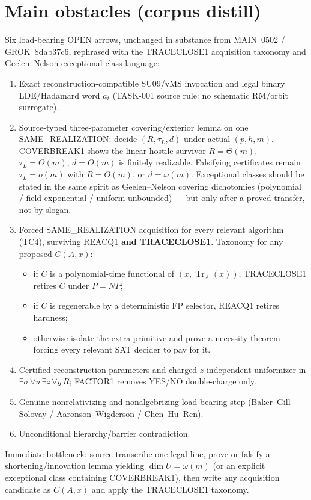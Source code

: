 \documentclass[11pt]{article}
\begin{document}
\section*{Main obstacles (corpus distill)}
Six load-bearing OPEN arrows, unchanged in substance from MAIN~0502 / GROK~8dab37c6,
rephrased with the TRACECLOSE1 acquisition taxonomy and Geelen--Nelson exceptional-class
language:
\begin{enumerate}
\item Exact reconstruction-compatible SU09/vMS invocation and legal binary LDE/Hadamard
word $a_t$ (TASK-001 source rule: no schematic RM/orbit surrogate).
\item Source-typed three-parameter covering/exterior lemma on one SAME\_REALIZATION:
decide $(R,\tau_L,d)$ under actual $(p,h,m)$. COVERBREAK1 shows the linear hostile
survivor $R=\Theta(m)$, $\tau_L=\Theta(m)$, $d=O(m)$ is finitely realizable. Falsifying
certificates remain $\tau_L=o(m)$ with $R=\Theta(m)$, or $d=\omega(m)$. Exceptional
classes should be stated in the same spirit as Geelen--Nelson covering dichotomies
(polynomial / field-exponential / uniform-unbounded) --- but only after a proved
transfer, not by slogan.
\item Forced SAME\_REALIZATION acquisition for every relevant algorithm (TC4), surviving
REACQ1 \textbf{and TRACECLOSE1}. Taxonomy for any proposed $C(A,x)$:
\begin{itemize}
\item if $C$ is a polynomial-time functional of $(x,\operatorname{Tr}_A(x))$, TRACECLOSE1
retires $C$ under $P=NP$;
\item if $C$ is regenerable by a deterministic FP selector, REACQ1 retires hardness;
\item otherwise isolate the extra primitive and prove a necessity theorem forcing every
relevant SAT decider to pay for it.
\end{itemize}
\item Certified reconstruction parameters and charged $z$-independent uniformizer in
$\exists\sigma\,\forall u\,\exists z\,\forall y\,R$; FACTOR1 removes YES/NO double-charge only.
\item Genuine nonrelativizing and nonalgebrizing load-bearing step
(Baker--Gill--Solovay / Aaronson--Wigderson / Chen--Hu--Ren).
\item Unconditional hierarchy/barrier contradiction.
\end{enumerate}
Immediate bottleneck: source-transcribe one legal line, prove or falsify a
shortening/innovation lemma yielding $\dim U=\omega(m)$ (or an explicit exceptional class
containing COVERBREAK1), then write any acquisition candidate as $C(A,x)$ and apply the
TRACECLOSE1 taxonomy.
\end{document}
